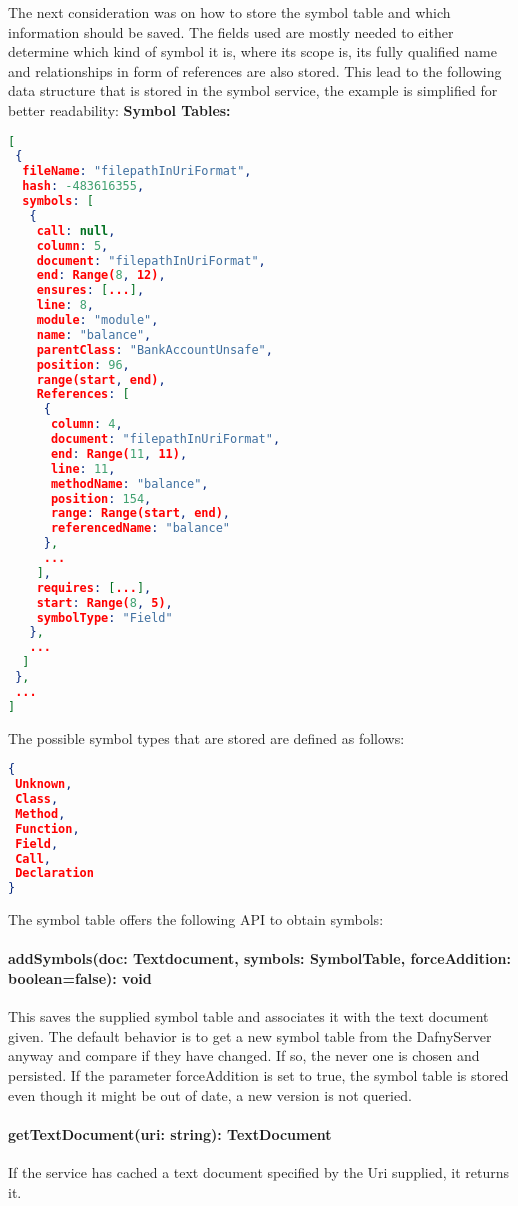 The next consideration was on how to store the symbol table and which information should be saved. The fields used are mostly needed to either determine which kind of symbol it is, where its scope is, its fully qualified name and relationships in form of references are also stored. This lead to the following data structure that is stored in the symbol service, the example is simplified for better readability: \newline
\newline\newline
\textbf{Symbol Tables: }
\begin{lstlisting}[language=json,firstnumber=1]
[
 {
  fileName: "filepathInUriFormat",
  hash: -483616355,
  symbols: [
   {
    call: null,
    column: 5,
    document: "filepathInUriFormat",
    end: Range(8, 12),
    ensures: [...],
    line: 8,
    module: "module",
    name: "balance",
    parentClass: "BankAccountUnsafe",
    position: 96,
    range(start, end),
    References: [
     {
      column: 4,
      document: "filepathInUriFormat",
      end: Range(11, 11),
      line: 11,
      methodName: "balance",
      position: 154,
      range: Range(start, end),
      referencedName: "balance"
     },
     ...
    ],
    requires: [...],
    start: Range(8, 5),
    symbolType: "Field"
   },
   ...
  ]
 },
 ...
]
\end{lstlisting}

The possible symbol types that are stored are defined as follows:
\begin{lstlisting}[language=json,firstnumber=1]
{
 Unknown,
 Class,
 Method,
 Function,
 Field,
 Call,
 Declaration	
}

\end{lstlisting}
The symbol table offers the following API to obtain symbols: \newline
\paragraph{addSymbols(doc: Textdocument, symbols: SymbolTable, forceAddition: boolean=false): void} This saves the supplied symbol table and associates it with the text document given. The default behavior is to get a new symbol table from the DafnyServer anyway and compare if they have changed. If so, the never one is chosen and persisted. If the parameter forceAddition is set to true, the symbol table is stored even though it might be out of date, a new version is not queried.

\paragraph{getTextDocument(uri: string): TextDocument} If the service has cached a text document specified by the Uri supplied, it returns it.

